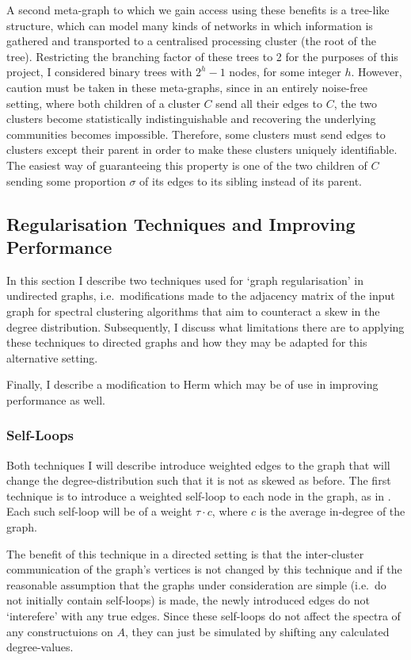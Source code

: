 A second meta-graph to which we gain access using these benefits is a tree-like structure, which 
can model many kinds of networks in which information is gathered and transported to a centralised 
processing cluster (the root of the tree). Restricting the branching factor of these trees to 2 
for the purposes of this 
project, I considered binary trees with $2^h-1$ nodes, for some integer $h$. However, caution must 
be taken in these meta-graphs, since in an entirely noise-free setting, where both children of a 
cluster $C$ send all their edges to $C$, the two clusters become statistically indistinguishable
and  recovering the underlying communities becomes impossible. Therefore, some clusters must send 
edges to clusters except their parent in order to make these clusters uniquely identifiable. 
The easiest way of guaranteeing this property is one of the two children of $C$ sending some 
proportion $\sigma$ of its edges to its sibling instead of its parent.

\subsection{Regularisation Techniques and Improving Performance}
In this section I describe two techniques used for `graph regularisation' in undirected graphs,
i.e.\ modifications made to the adjacency matrix of the input graph for spectral clustering 
algorithms that aim to counteract a skew in the degree distribution. Subsequently, I discuss what 
limitations there are to applying these techniques to directed graphs and how they may be adapted 
for this alternative setting. 

Finally, I describe a modification to Herm which may be of use in improving performance
as well.

\subsubsection{Self-Loops}
Both techniques I will describe introduce weighted edges to the graph that will change the 
degree-distribution such that it is not as skewed as before. The first technique is to introduce 
a weighted self-loop to each node in the graph, as in \cite{selfloops}. %
Each such self-loop will be of a weight $\tau\cdot c$, where $c$ is the average in-degree of the graph. 

The benefit of this technique in a directed setting is that the inter-cluster communication of 
the graph's vertices is not changed by this technique and if the reasonable assumption that the
graphs under consideration are simple (i.e.\ do not initially contain self-loops) is made, the newly 
introduced edges do not `interefere' with any true edges. Since these self-loops do not affect the spectra of any constructuions on $A$, they can just be simulated by shifting any calculated degree-values.

